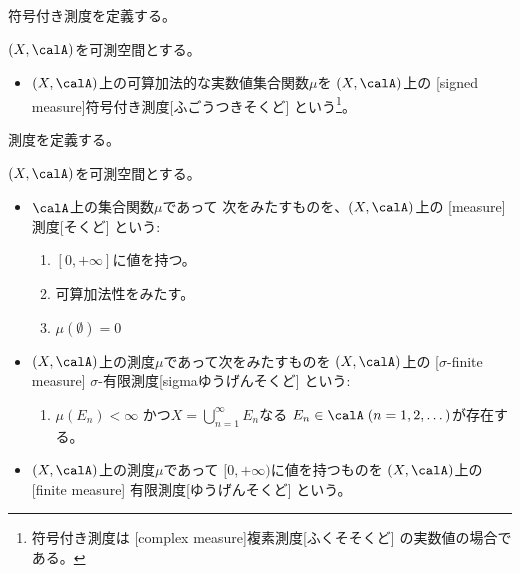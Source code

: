 \documentclass[report]{jlreq}
\begin{document}
符号付き測度を定義する。

\begin{definition}[符号付き測度]
    $(X, \calA)$を可測空間とする。
    \begin{itemize}
        \item $(X, \calA)$上の可算加法的な実数値集合関数$\mu$を
            $(X, \calA)$上の
            [signed measure]{符号付き測度}[ふごうつきそくど]
            という\footnote{
                符号付き測度は
                [complex measure]{複素測度}[ふくそそくど]
                の実数値の場合である。
            }。
    \end{itemize}
\end{definition}

測度を定義する。

\begin{definition}[測度]
    $(X, \calA)$を可測空間とする。
    \begin{itemize}
        \item $\calA$上の集合関数$\mu$であって
            次をみたすものを、$(X, \calA)$上の
            [measure]{測度}[そくど]
            という:
            \begin{enumerate}
                \item $[0, +\infty]$に値を持つ。
                \item 可算加法性をみたす。
                \item $\mu(\emptyset) = 0$
            \end{enumerate}
        \item $(X, \calA)$上の測度$\mu$であって次をみたすものを
            $(X, \calA)$上の
            [$\sigma$-finite measure]
                {$\sigma$-有限測度}[sigmaゆうげんそくど]
            という:
            \begin{enumerate}
                \item $\mu(E_n) < \infty$
                    かつ$X = \bigcup_{n = 1}^\infty E_n$なる
                    $E_n \in \calA \; (n = 1, 2, \dots)$が存在する。
            \end{enumerate}
        \item $(X, \calA)$上の測度$\mu$であって
            $[0, +\infty)$に値を持つものを
            $(X, \calA)$上の
            [finite measure]
                {有限測度}[ゆうげんそくど]
            という。
    \end{itemize}
\end{definition}
\end{document}
